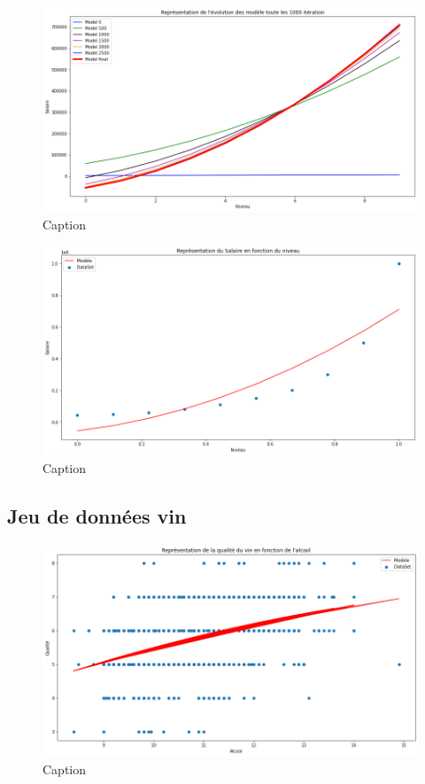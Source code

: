 \documentclass[french]{article}
\begin{document}
\begin{figure}[!htbp]
    \centering
    \includegraphics[width=\textwidth]{Rapport/images/evo_MLP.png}
    \caption{Caption}
    \label{fig:my_label}
\end{figure}

\begin{figure}[!htbp]
    \centering
    \includegraphics[width=\textwidth]{Rapport/images/modele_MLP.png}
    \caption{Caption}
    \label{fig:my_label}
\end{figure}

\subsection{Jeu de données vin}

\begin{figure}[!htbp]
    \centering
    \includegraphics[width=\textwidth]{Rapport/images/modele_MLP2.png}
    \caption{Caption}
    \label{fig:my_label}
\end{figure}
\end{document}
